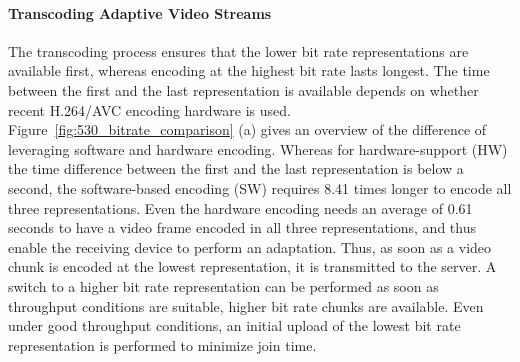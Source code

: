 \paragraph{Transcoding Adaptive Video Streams}
The transcoding process ensures that the lower bit rate representations are available first, whereas encoding at the highest bit rate lasts longest.
The time between the first and the last representation is available depends on whether recent H.264/AVC encoding hardware is used.
Figure~\ref{fig:530_bitrate_comparison} (a) gives an overview of the difference of leveraging software and hardware encoding.
Whereas for hardware-support (HW) the time difference between the first and the last representation is below a second, the software-based encoding (SW) requires 8.41 times longer to encode all three representations.
Even the hardware encoding needs an average of 0.61 seconds to have a video frame encoded in all three representations, and thus enable the receiving device to perform an adaptation.
Thus, as soon as a video chunk is encoded at the lowest representation, it is transmitted to the server.
A switch to a higher bit rate representation can be performed as soon as throughput conditions are suitable, higher bit rate chunks are available.
Even under good throughput conditions, an initial upload of the lowest bit rate representation is performed to minimize join time.
